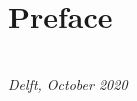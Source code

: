 \chapter*{Preface}



\begin{flushright}
{\makeatletter\itshape
    \@author \\
    Delft, October 2020
\makeatother}
\end{flushright}

